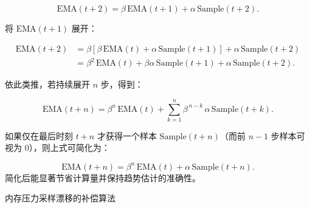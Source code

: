 \begin{equation}
\text{EMA}(t+2) = \beta \,\text{EMA}(t+1) + \alpha \,\text{Sample}(t+2).
\end{equation}

将 \(\text{EMA}(t+1)\) 展开：

\begin{equation}
\begin{aligned}
\text{EMA}(t+2)
&= \beta \left[\beta\,\text{EMA}(t) + \alpha\,\text{Sample}(t+1)\right] + \alpha\,\text{Sample}(t+2) \\
&= \beta^2 \,\text{EMA}(t) + \beta \alpha\,\text{Sample}(t+1) + \alpha\,\text{Sample}(t+2).
\end{aligned}
\end{equation}

依此类推，若持续展开 \(n\) 步，得到：

\begin{equation}
\text{EMA}(t+n) = \beta^n \,\text{EMA}(t) + \sum_{k=1}^{n} \beta^{\,n-k} \, \alpha \,\text{Sample}(t+k).
\end{equation}

如果仅在最后时刻 \(t+n\) 才获得一个样本 \(\text{Sample}(t+n)\)（而前 \(n-1\) 步样本可视为 0），则上式可简化为：

\begin{equation}
\label{eq:EMA_2}
\text{EMA}(t+n) = \beta^n \,\text{EMA}(t) + \alpha \,\text{Sample}(t+n).
\end{equation}
简化后能显著节省计算量并保持趋势估计的准确性。

\begin{algorithm}[H]
    \caption{内存压力采样漂移的补偿算法}
    \label{alg:mp-drift-compensation}

    \SetAlgoLined
    \LinesNumbered
\end{algorithm}

